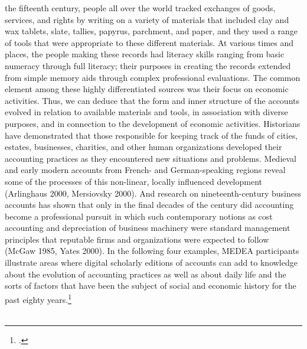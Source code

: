 \documentclass[12pt,a4paper]{article}
\begin{document}
the fifteenth century, people all over the world tracked exchanges of goods, services, and rights
by writing on a variety of materials that included clay and wax tablets, slate, tallies, papyrus,
parchment, and paper, and they used a range of tools that were appropriate to these different
materials. At various times and places, the people making these records had literacy skills
ranging from basic numeracy through full literacy; their purposes in creating the records
extended from simple memory aids through complex professional evaluations. The common
element among these highly differentiated sources was their focus on economic activities. Thus,
we can deduce that the form and inner structure of the accounts evolved in relation to available
materials and tools, in association with diverse purposes, and in connection to the development
of economic activities.
Historians have demonstrated that those responsible for keeping track of the funds of cities,
estates, businesses, charities, and other human organizations developed their accounting
practices as they encountered new situations and problems. Medieval and early modern accounts
from French- and German-speaking regions reveal some of the processes of this non-linear,
locally influenced development (Arlinghaus 2000, Mersiovsky 2000). And research on
nineteenth-century business accounts has shown that only in the final decades of the century did
accounting become a professional pursuit in which such contemporary notions as cost accounting
and depreciation of business machinery were standard management principles that reputable
firms and organizations were expected to follow (McGaw 1985, Yates 2000). In the following
four examples, MEDEA participants illustrate areas where digital scholarly editions of accounts
can add to knowledge about the evolution of accounting practices as well as about daily life and
the sorts of factors that have been the subject of social and economic history for the past eighty
years.\footcite[][S.2]{tomasekmedea}
\\
\\
\end{document}
